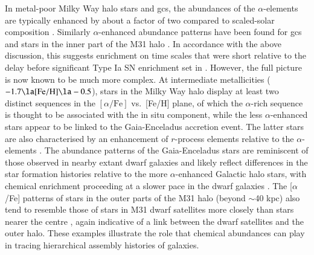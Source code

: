 \documentclass{aa}
\begin{document}
In metal-poor Milky Way halo stars and \acp{gc}, the abundances of the $\alpha$-elements are typically enhanced by about a factor of two compared to scaled-solar composition 
\citep{Cohen1978,Pilachowski1980,Sneden1979,Luck1981}. Similarly $\alpha$-enhanced abundance patterns have been found for \acp{gc} and stars in the inner part of the M31 halo \citep{Beasley2005,Colucci2014,Sakari2016,Escala2019,Escala2020a}. In accordance with the above discussion, this suggests enrichment on time scales that were short relative to the delay before significant Type Ia SN enrichment set in \citep{McWilliam1997,Gilmore1998}.
However, the full picture is now known to be much more complex. At intermediate 
metallicities ($-1.7 \la \mathrm{[Fe/H]} \la -0.5$), stars in the Milky Way halo display at least two distinct sequences in the $[\alpha/\mathrm{Fe}]$ vs.\ [Fe/H] plane, of which the
$\alpha$-rich sequence is thought to be associated with the in situ component, while the
less $\alpha$-enhanced stars appear to be linked to the Gaia-Enceladus accretion event. The latter stars are also characterised by an enhancement of $r$-process elements relative to the $\alpha$-elements \citep{Nissen2010,Helmi2018,Matsuno2021,Matsuno2021a}.
The abundance patterns of the Gaia-Enceladus stars are reminiscent of those observed in nearby extant dwarf galaxies and likely reflect differences in the star formation histories relative to the more $\alpha$-enhanced Galactic halo stars, with chemical enrichment proceeding at a slower pace in the dwarf galaxies \citep{Shetrone2001,Venn2004,Tolstoy2009,McWilliam2013,Lemasle2014}.
The [$\alpha$/Fe] patterns of stars in the outer parts of the M31 halo (beyond $\sim$40 kpc) also tend to resemble those of stars in M31 dwarf satellites more closely than stars nearer the centre \citep{Gilbert2020}, again indicative of a link between the dwarf satellites and the outer halo. 
These examples illustrate the role that chemical abundances can play in tracing hierarchical assembly histories of galaxies.
\end{document}
